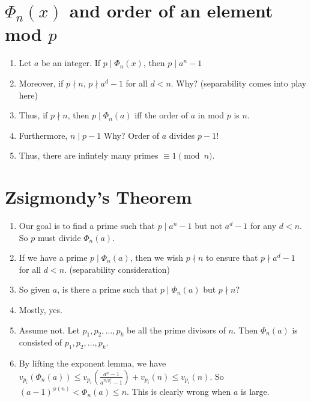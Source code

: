 \documentclass[20pt]{scrartcl}
\begin{document}
\section{$\Phi_n(x)$ and order of an element mod $p$}
\begin{enumerate}
    \item Let $a$ be an integer. If $p\mid \Phi_n(x)$, then $p\mid a^n-1$
    \item Moreover, if $p\nmid n$, $p\nmid a^d-1$ for all $d<n$. Why? (separability comes into play here)
    \item Thus, if $p\nmid n$, then $p\mid \Phi_n(a)$ iff the order of $a$ in mod $p$ is $n$. 
    \item Furthermore, $n\mid p-1$ Why? Order of $a$ divides $p-1$!
    \item Thus, there are infintely many primes $\equiv 1\pmod n$. 
\end{enumerate}
\section{Zsigmondy's Theorem}
\begin{enumerate}
    \item Our goal is to find a prime such that $p\mid a^n-1$ but not $a^d-1$ for any $d<n$. So $p$ must divide $\Phi_n(a)$. 
    \item If we have a prime $p\mid \Phi_n(a)$, then we wish $p\nmid n$ to ensure that $p\nmid a^d-1$ for all $d<n$. (separability consideration)
    \item So given $a$, is there a prime such that $p\mid \Phi_n(a)$ but $p\nmid n$? 
    \item Mostly, yes. 
    \item Assume not. Let $p_1, p_2, \ldots, p_k$ be all the prime divisors of $n$. Then $\Phi_n(a)$ is consisted of $p_1, p_2, \ldots, p_k$. 
    \item By lifting the exponent lemma, we have $v_{p_i}(\Phi_n(a)) \leq v_{p_i}(\frac{a^n-1}{a^{n/p_i^e}-1}) + v_{p_i}(n)\leq v_{p_i}(n)$. So $(a-1)^{\phi(n)}<\Phi_n(a)\leq n$. This is clearly wrong when $a$ is large.
\end{enumerate}
\end{document}
